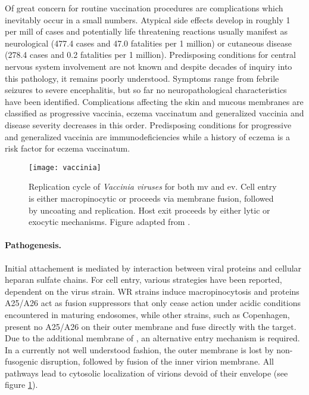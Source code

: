 Of great concern for routine vaccination procedures are complications which inevitably occur in a small numbers. Atypical side effects develop in roughly 1 per mill of cases and potentially life threatening reactions usually manifest as neurological (477.4 cases and 47.0 fatalities per 1 million) or cutaneous disease (278.4 cases and 0.2 fatalities per 1 million). Predisposing conditions for central nervous system involvement are not known and despite decades of inquiry into this pathology, it remains poorly understood. Symptoms range from febrile seizures to severe encephalitis, but so far no  neuropathological characteristics have been identified. Complications affecting the skin and mucous membranes are classified as progressive vaccinia, eczema vaccinatum and generalized vaccinia and disease severity decreases in this order. Predisposing conditions for progressive and generalized vaccinia are immunodeficiencies while a history of eczema is a risk factor for eczema vaccinatum.

\begin{figure}[t]
  \centering
  \texttt{[image: vaccinia]}
  \caption[Replication cycle of \textit{Vaccinia viruses} for both intracellular mature and extracellular enveloped virions.]{Replication cycle of \textit{Vaccinia viruses} for both \acrfull{mv} and \acrfull{ev}. Cell entry is either macropinocytic or proceeds via membrane fusion, followed by uncoating and replication. Host exit proceeds by either lytic or exocytic mechanisms. Figure adapted from \citet{Hulo2011}.}
  \label{fig:vaccinia}
\end{figure}

\paragraph{Pathogenesis.}
Initial attachement is mediated by interaction between viral proteins and cellular heparan sulfate chains. For cell entry, various strategies have been reported, dependent on the virus strain. WR strains induce macro\-pinocytosis and proteins A25\slash A26 act as fusion suppressors that only cease action under acidic conditions encountered in maturing endosomes, while other strains, such as Copenhagen, present no A25\slash A26 on their outer membrane and fuse directly with the target. Due to the additional membrane of , an alternative entry mechanism is required. In a currently not well understood fashion, the outer membrane is lost by non-fusogenic disruption, followed by fusion of the inner virion membrane. All pathways lead to cytosolic localization of virions devoid of their envelope (see figure \ref{fig:vaccinia}).

